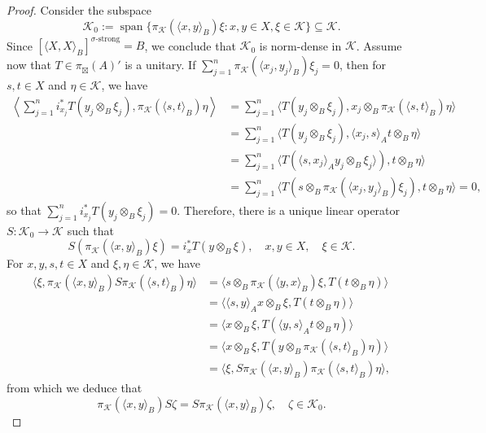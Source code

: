 \documentclass[reqno]{amsart}
\numberwithin{equation}{section}
\begin{document}
\begin{proof}
    Consider the subspace $$\mathcal{K}_0:= \operatorname{span}\{\pi_{\mathcal{K}}(\langle x,y\rangle_B)\xi: x,y \in X, \xi \in \mathcal{K}\}\subseteq \mathcal{K}.$$
    Since $[\langle X,X\rangle_B]^{\sigma\text{-strong}}=B$, we conclude that $\mathcal{K}_0$ is norm-dense in $\mathcal{K}$.
    Assume now that $T \in \pi_\boxtimes(A)'$ is a unitary. If $\sum_{j=1}^n \pi_\mathcal{K}(\langle x_j, y_j\rangle_B)\xi_j = 0$, then for $s,t \in X$ and $\eta \in \mathcal{K}$, we have
    \begin{align*}
\left \langle \sum_{j=1}^n i_{x_j}^* T(y_j\otimes_B \xi_j), \pi_\mathcal{K}(\langle s,t\rangle_B)\eta\right\rangle&= \sum_{j=1}^n \langle T(y_j\otimes_B \xi_j), x_j\otimes_B \pi_\mathcal{K}(\langle s,t\rangle_B)\eta\rangle\\
&= \sum_{j=1}^n \langle T(y_j\otimes_B \xi_j), \langle x_j, s\rangle_A t \otimes_B \eta\rangle\\
&=\sum_{j=1}^n \langle T(\langle s, x_j\rangle_A y_j\otimes_B \xi_j\rangle), t \otimes_B \eta\rangle\\
&=\sum_{j=1}^n \langle T(s \otimes_B \pi_\mathcal{K}(\langle x_j, y_j\rangle_B)\xi_j), t \otimes_B \eta\rangle = 0,\end{align*}
    so that $\sum_{j=1}^n i_{x_j}^* T(y_j\otimes_B \xi_j)= 0$. Therefore, there is a unique linear operator $S: \mathcal{K}_0\to \mathcal{K}$ such that 
   $$S(\pi_{\mathcal{K}}(\langle x,y\rangle_B)\xi) = i_x^* T(y\otimes_B \xi), \quad x,y \in X, \quad \xi \in \mathcal{K}.$$
For $x,y,s,t \in X$ and $\xi, \eta \in \mathcal{K}$, we have
\begin{align*}
    \langle \xi, \pi_{\mathcal{K}}(\langle x,y\rangle_B) S \pi_{\mathcal{K}}(\langle s,t\rangle_B)\eta\rangle &= \langle s\otimes_B \pi_{\mathcal{K}}(\langle y,x\rangle_B)\xi, T(t\otimes_B \eta)\rangle \\
    &= \langle \langle s,y\rangle_A x \otimes_B \xi, T(t\otimes_B \eta)\rangle\\
    &=\langle x \otimes_B \xi, T(\langle y,s\rangle_A t \otimes_B \eta)\rangle\\
    &= \langle x \otimes_B \xi, T(y\otimes_B \pi_{\mathcal{K}}(\langle s,t\rangle_B) \eta)\rangle\\
    &= \langle \xi, S\pi_{\mathcal{K}}(\langle x,y\rangle_B) \pi_{\mathcal{K}}(\langle s,t\rangle_B) \eta\rangle,
\end{align*}
from which we deduce that
\begin{equation}\label{intertwine}
    \pi_{\mathcal{K}}(\langle x,y\rangle_B)S \zeta = S \pi_{\mathcal{K}}(\langle x,y\rangle_B)\zeta, \quad \zeta \in \mathcal{K}_0.

\end{equation}
\end{proof}
\end{document}
